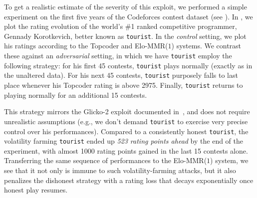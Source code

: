To get a realistic estimate of the severity of this exploit, we performed a simple experiment on the first five years of the Codeforces contest dataset (see ). In , we plot the rating evolution of the world's \#1 ranked competitive programmer, Gennady Korotkevich, better known as {\tt tourist}. In the \emph{control} setting, we plot his ratings according to the Topcoder and Elo-MMR($1$) systems. We contrast these against an \emph{adversarial} setting, in which we have {\tt tourist} employ the following strategy: for his first 45 contests, {\tt tourist} plays normally (exactly as in the unaltered data). For his next 45 contests, {\tt tourist} purposely falls to last place whenever his Topcoder rating is above 2975. Finally, {\tt tourist} returns to playing normally for an additional 15 contests.

This strategy mirrors the Glicko-2 exploit documented in~\cite{pokemongo}, and does not require unrealistic assumptions (e.g., we don't demand {\tt tourist} to exercise very precise control over his performances). Compared to a consistently honest {\tt tourist}, the volatility farming {\tt tourist} ended up \emph{523 rating points ahead} by the end of the experiment, with almost 1000 rating points gained in the last 15 contests alone. Transferring the same sequence of performances to the Elo-MMR($1$) system, we see that it not only is immune to such volatility-farming attacks, but it also penalizes the dishonest strategy with a rating loss that decays exponentially once honest play resumes.

